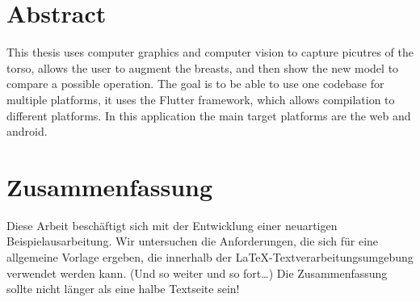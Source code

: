 \chapter*{Abstract}

This thesis uses computer graphics and computer vision to capture picutres of the torso, allows the user to augment the breasts, and then show the new model to compare a possible operation. The goal is to be able to use one codebase for multiple platforms, it uses the Flutter framework, which allows compilation to different platforms. In this application the main target platforms are the web and android.

\cleardoublepage
\chapter*{Zusammenfassung}

Diese Arbeit beschäftigt sich mit der Entwicklung einer neuartigen Beispielausarbeitung. Wir untersuchen die Anforderungen, die sich für eine allgemeine Vorlage ergeben, die innerhalb der \LaTeX-Textverarbeitungsumgebung verwendet werden kann. (Und so weiter und so fort\dots) Die Zusammenfassung sollte nicht länger als eine halbe Textseite sein!
